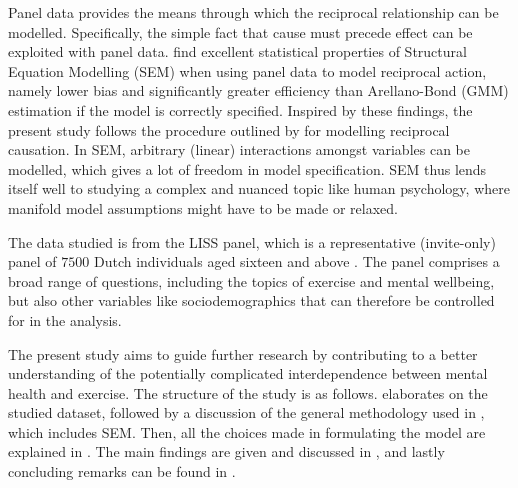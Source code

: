 Panel data provides the means through which the reciprocal relationship can be modelled. Specifically, the simple fact
that cause must precede effect can be exploited with panel data.
 find excellent statistical properties of Structural Equation Modelling (SEM)
when using panel data to model reciprocal action, namely lower bias and significantly greater efficiency than Arellano-Bond
(GMM) estimation if the model is correctly specified.
Inspired by these findings, the present study follows the procedure outlined by 
for modelling reciprocal causation.
In SEM, arbitrary (linear) interactions amongst variables can be modelled, which gives a lot of freedom in model
specification. SEM thus lends itself well to studying a complex and nuanced topic like human psychology,
where manifold model assumptions might have to be made or relaxed.

The data studied is from the LISS panel, which is a representative (invite-only) panel of $7500$ Dutch individuals aged
sixteen and above \cite{scherpenzeel2010liss}. The panel comprises a broad range of questions, including the topics of exercise
and mental wellbeing, but also other variables like sociodemographics that can therefore be controlled for in the analysis.

The present study aims to guide further research by contributing to a better understanding of the potentially
complicated interdependence between mental health and exercise.
The structure of the study is as follows.
 elaborates on the studied dataset, followed by a discussion of the
general methodology used in , which includes SEM.
Then, all the choices made in formulating the model are explained in .
The main findings are given and discussed in ,
and lastly concluding remarks can be found in .
